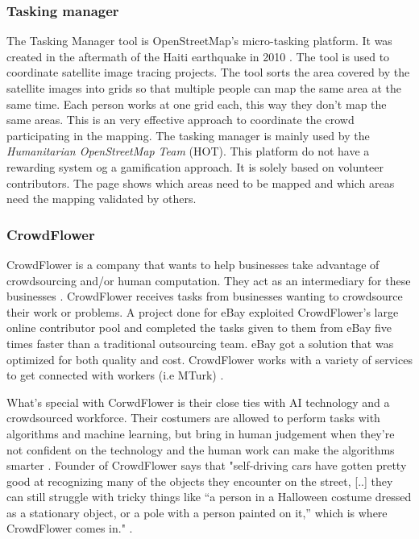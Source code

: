 \subsubsection{Tasking manager}
The Tasking Manager tool is OpenStreetMap's micro-tasking platform. It was created in the aftermath of the Haiti earthquake in 2010 \citep{Palen2015}. The tool is used to coordinate satellite image tracing projects. The tool sorts the area covered by the satellite images into grids so that multiple people can map the same area at the same time. Each person works at one grid each, this way they don't map the same areas. This is an very effective approach to coordinate the crowd participating in the mapping. The tasking manager is mainly used by the \textit{Humanitarian OpenStreetMap Team} (HOT). This platform do not have a rewarding system og a gamification approach. It is solely based on volunteer contributors. The page shows which areas need to be mapped and which areas need the mapping validated by others. 

\subsubsection{CrowdFlower}  
CrowdFlower is a company that wants to help businesses take advantage of crowdsourcing and/or human computation. They act as an intermediary for these businesses \citep{Quinn2011}. CrowdFlower receives tasks from businesses wanting to crowdsource their work or problems. A project done for eBay exploited CrowdFlower's large online contributor pool and completed the tasks given to them from eBay five times faster than a traditional outsourcing team. eBay got a solution that was optimized for both quality and cost. CrowdFlower works with a variety of services to get connected with workers (i.e MTurk) \citep{Quinn2011}. 

What's special with CorwdFlower is their close ties with AI technology and a crowdsourced workforce. Their costumers are allowed to perform tasks with algorithms and machine learning, but bring in human judgement when they're not confident on the technology and the human work can make the algorithms smarter \citep{Ha2016}.  Founder of CrowdFlower says that "self-driving cars have gotten pretty good at recognizing many of the objects they encounter on the street, [..] they can still struggle with tricky things like “a person in a Halloween costume dressed as a stationary object, or a pole with a person painted on it,” which is where CrowdFlower comes in." \citep{Ha2016}. 

